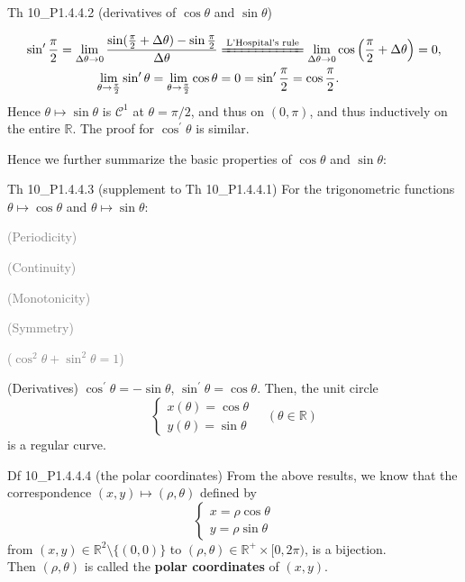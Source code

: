 \documentclass{article}
\begin{document}
\begin{Th}{Th 10\_P1.4.4.2 (derivatives of $\cos \theta$ and $\sin \theta$)}
\begin{compactenum}
$$\begin{aligned}
            \sin^\prime \frac{\pi}{2} = \lim\limits_{\Delta\theta\to 0} \frac{\sin (\frac{\pi}{2} + \Delta\theta) - \sin \frac{\pi}{2}}{\Delta\theta} & \xlongequal{\text{L'Hospital's rule}} \lim\limits_{\Delta\theta\to 0} \cos \left(\frac{\pi}{2}+\Delta\theta\right) = 0, \\
            \lim\limits_{\theta\to \frac{\pi}{2}} \sin^\prime \theta = \lim\limits_{\theta\to \frac{\pi}{2}} \cos \theta & = 0 = \sin^\prime \frac{\pi}{2} = \cos \frac{\pi}{2}.
        \end{aligned}
        $$
        Hence $\theta\mapsto \sin \theta$ is $\mathcal{C}^1$ at $\theta = \pi/2$, and thus on $(0, \pi)$, and thus inductively on the entire $\mathbb{R}$. The proof for $\cos^\prime \theta$ is similar.
    \end{compactenum}
\end{Th}

Hence we further summarize the basic properties of $\cos \theta$ and $\sin \theta$:

\begin{Th}{Th 10\_P1.4.4.3 (supplement to Th 10\_P1.4.4.1)}
    For the trigonometric functions $\theta \mapsto \cos \theta$ and $\theta \mapsto \sin \theta$:
    \begin{compactenum}
        \item \textcolor{gray}{(Periodicity)}
        \item \textcolor{gray}{(Continuity)}
        \item \textcolor{gray}{(Monotonicity)}
        \item \textcolor{gray}{(Symmetry)}
        \item \textcolor{gray}{($\cos^2 \theta + \sin^2 \theta = 1$)}
        \item (Derivatives) $\cos^\prime \theta = -\sin \theta$, $\sin^\prime \theta = \cos \theta$. Then, the unit circle
        $$ \begin{cases}
            x(\theta) = \cos \theta \\
            y(\theta) = \sin \theta
        \end{cases} \quad (\theta\in \mathbb{R}) $$
        is a regular curve.
    \end{compactenum}
\end{Th}

\begin{Df}{Df 10\_P1.4.4.4 (the polar coordinates)}
    \textcolor{Th}{From the above results, we know that the correspondence $(x,y)\mapsto (\rho, \theta)$ defined by
    $$ \begin{cases}
        x = \rho \cos \theta \\
        y = \rho \sin \theta
    \end{cases} $$
    from $(x, y)\in \mathbb{R}^2\setminus \{(0, 0)\}$ to $(\rho, \theta)\in \mathbb{R}^+\times [0, 2\pi)$, is a bijection.} \\
    Then $(\rho, \theta)$ is called the \textbf{polar coordinates} of $(x, y)$. 
\end{Df}
\end{document}
